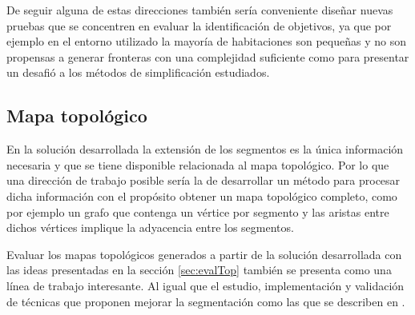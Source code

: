 De seguir alguna de estas direcciones también sería conveniente diseñar nuevas
pruebas que se concentren en evaluar la identificación de objetivos, ya que por
ejemplo en el entorno utilizado la mayoría de habitaciones son pequeñas y no son
propensas a generar fronteras con una complejidad suficiente como para
presentar un desafió a los métodos de simplificación estudiados.







\subsection{Mapa topológico}

En la solución desarrollada la extensión de los segmentos es la única
información necesaria y que se tiene disponible relacionada al mapa topológico.
Por lo que una dirección de trabajo posible sería la de desarrollar un método
para procesar dicha información con el propósito obtener un mapa topológico
completo, como por ejemplo un grafo que contenga un vértice por segmento y las
aristas entre dichos vértices implique la adyacencia entre los segmentos.

Evaluar los mapas topológicos generados a partir de la solución desarrollada
con las ideas presentadas en la sección \ref{sec:evalTop} también se presenta
como una línea de trabajo interesante. Al igual que el estudio, implementación
y validación de técnicas que proponen mejorar la segmentación como las que se
describen en \cite{Thrun1998,wurm2008coordinated,Liu2015}.

